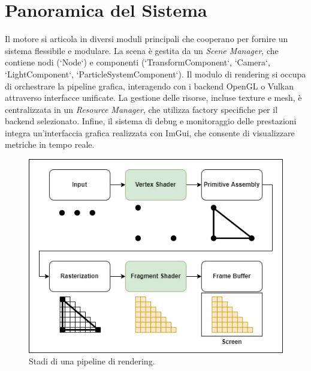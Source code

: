 \documentclass[12pt,a4paper,openright,twoside]{book}
\begin{document}
\section{Panoramica del Sistema}
Il motore si articola in diversi moduli principali che cooperano per fornire un sistema flessibile e modulare.
La scena è gestita da un \emph{Scene Manager}, che contiene nodi (`Node`) e componenti (`TransformComponent`, `Camera`,
`LightComponent`, `ParticleSystemComponent`). Il modulo di rendering si occupa di orchestrare la pipeline grafica,
interagendo con i backend OpenGL o Vulkan attraverso interfacce unificate. La gestione delle risorse, incluse texture e
mesh, è centralizzata in un \emph{Resource Manager}, che utilizza factory specifiche per il backend selezionato.
Infine, il sistema di debug e monitoraggio delle prestazioni integra un'interfaccia grafica realizzata con ImGui,
che consente di visualizzare metriche in tempo reale.
\begin{figure}[H]
   \centering
   \includegraphics[width=.8\linewidth]{figures/rendering_pipeline_overview.png}
   \caption{Stadi di una pipeline di rendering.}
   \label{fig:rendering-pipeline-overview}
\end{figure}
\end{document}

